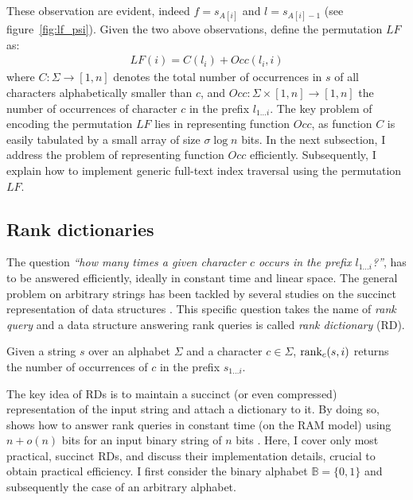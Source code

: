 These observation are evident, indeed $f = s_{A[i]}$ and $l = s_{A[i] - 1}$ (see figure~\ref{fig:lf_psi}).
Given the two above observations, \citeauthor{Ferragina2000} define the permutation $LF$ as:
\begin{eqnarray}
LF(i) = C(l_i) + Occ(l_i, i)
\end{eqnarray}
where $C : \Sigma \rightarrow [1,n]$ denotes the total number of occurrences in $s$ of all characters alphabetically smaller than $c$, and $Occ :  \Sigma \times [1,n] \rightarrow [1,n]$ the number of occurrences of character $c$ in the prefix $l_{1 \dots i}$.
The key problem of encoding the permutation $LF$ lies in representing function $Occ$, as function $C$ is easily tabulated by a small array of size $\sigma \log{n}$ bits.
In the next subsection, I address the problem of representing function $Occ$ efficiently. Subsequently, I explain how to implement generic full-text index traversal using the permutation $LF$.

\subsection{Rank dictionaries}
\label{sec:index:succinct:rd}

The question \emph{``how many times a given character $c$ occurs in the prefix $l_{1 \dots i}$?''}, has to be answered efficiently, ideally in constant time and linear space.
The general problem on arbitrary strings has been tackled by several studies on the succinct representation of data structures \citep{Jacobson1989}.
This specific question takes the name of \emph{rank query} and a data structure answering rank queries is called \emph{rank dictionary} (RD).

\begin{definition}
Given a string $s$ over an alphabet $\Sigma$ and a character $c \in \Sigma$, $\text{rank}_c(s, i)$ returns the number of occurrences of $c$ in the prefix $s_{1 \dots i}$.
\end{definition}

The key idea of RDs is to maintain a succinct (or even compressed) representation of the input string and attach a dictionary to it.
By doing so, \citeauthor{Jacobson1989} shows how to answer rank queries in constant time (on the RAM model) using $n+o(n)$ bits for an input binary string of $n$ bits \citep{Jacobson1989}.
Here, I cover only most practical, succinct RDs, and discuss their implementation details, crucial to obtain practical efficiency.
I first consider the binary alphabet $\mathbb{B} = \{ 0, 1 \}$ and subsequently the case of an arbitrary alphabet.

